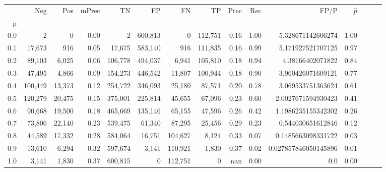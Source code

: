 \begin{tabular}{rrrrrrrrrrrrrrr}
\toprule
{} &      Neg &     Pos & mPrec &       TN &       FP &       FN &       TP &  Prec &   Rec &                  FP/P & $\hat{p}$ \\
p   &          &         &       &          &          &          &          &       &       &                       &           \\
\midrule
0.0 &        2 &       0 &  0.00 &        2 &  600,813 &        0 &  112,751 &  0.16 &  1.00 &     5.328671142606274 &      1.00 \\
0.1 &   17,673 &     916 &  0.05 &   17,675 &  583,140 &      916 &  111,835 &  0.16 &  0.99 &     5.171927521707125 &      0.97 \\
0.2 &   89,103 &   6,025 &  0.06 &  106,778 &  494,037 &    6,941 &  105,810 &  0.18 &  0.94 &      4.38166402071822 &      0.84 \\
0.3 &   47,495 &   4,866 &  0.09 &  154,273 &  446,542 &   11,807 &  100,944 &  0.18 &  0.90 &     3.960426071609121 &      0.77 \\
0.4 &  100,449 &  13,373 &  0.12 &  254,722 &  346,093 &   25,180 &   87,571 &  0.20 &  0.78 &     3.069533751363624 &      0.61 \\
0.5 &  120,279 &  20,475 &  0.15 &  375,001 &  225,814 &   45,655 &   67,096 &  0.23 &  0.60 &    2.0027671594930423 &      0.41 \\
0.6 &   90,668 &  19,500 &  0.18 &  465,669 &  135,146 &   65,155 &   47,596 &  0.26 &  0.42 &    1.1986235155342302 &      0.26 \\
0.7 &   73,806 &  22,140 &  0.23 &  539,475 &   61,340 &   87,295 &   25,456 &  0.29 &  0.23 &     0.544030651612846 &      0.12 \\
0.8 &   44,589 &  17,332 &  0.28 &  584,064 &   16,751 &  104,627 &    8,124 &  0.33 &  0.07 &    0.1485663098331722 &      0.03 \\
0.9 &   13,610 &   6,294 &  0.32 &  597,674 &    3,141 &  110,921 &    1,830 &  0.37 &  0.02 &  0.027857846050145896 &      0.01 \\
1.0 &    3,141 &   1,830 &  0.37 &  600,815 &        0 &  112,751 &        0 &   nan &  0.00 &                   0.0 &      0.00 \\
\bottomrule
\end{tabular}
